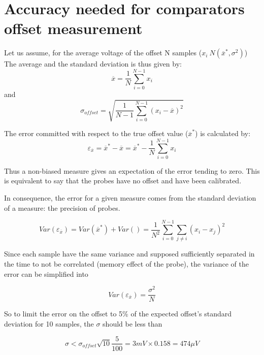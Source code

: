 
\chapter{Accuracy needed for comparators offset measurement}
\label{app:acc-offset}

Let us assume, for the average voltage of the offset N samples ($x_i ~ N(\overline{x}^*, \sigma^2)$) The average and the standard deviation is thus given by:
\begin{equation}
    \overline{x} = \frac{1}{N}\sum_{i=0}^{N-1}{x_i}
\end{equation}
and
\begin{equation}
    \sigma_{offset} = \sqrt{\frac{1}{N-1}\sum_{i=0}^{N-1}{(x_i - \overline{x})^2}}
\end{equation}

The error committed with respect to the true offset value ($\overline{x}^*$) is calculated by:
\begin{equation}
    \varepsilon_{\overline{x}} = \overline{x}^*-\overline{x} = \overline{x}^* - \frac{1}{N}\sum_{i=0}^{N-1}{x_i}
\end{equation}

Thus a non-biased measure gives an expectation of the error tending to zero. This is equivalent to say that
the probes have no offset and have been calibrated.

In consequence, the error for a given measure comes from the standard deviation of a measure: the
precision of probes.

\begin{equation}
    Var\left(\varepsilon_{\overline{x}}\right) = Var\left(\overline{x}^*\right) + Var\left( \right) = \frac{1}{N^2} \sum_{i=0}^{N-1}{\sum_{j\neq i}{(x_i-x_j)^2}}
\end{equation}

Since each sample have the same variance and supposed sufficiently separated in the time to not be
correlated (memory effect of the probe), the variance of the error can be simplified into

\begin{equation}
    Var\left(\varepsilon_{\overline{x}}\right) = \frac{\sigma^2}{N}
\end{equation}

So to limit the error on the offset to 5\% of the expected offset’s standard deviation for 10 samples, the $\sigma$
should be less than

\begin{equation}
    \sigma < \sigma_{offset} \sqrt{10}\frac{5}{100} = 3 mV \times 0.158 = 474 \mu V
\end{equation}